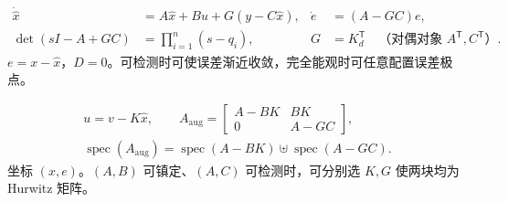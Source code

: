 {\[
\begin{aligned}
    \dot{\hat x}&=A\hat x+Bu+G(y-C\hat x),&
    \dot e&=(A-GC)e,\\
    \det(sI-A+GC)&=\prod\nolimits_{i=1}^{n}(s-q_i),&
    G&=K_d^{\mathsf T}\quad\text{（对偶对象 }A^{\mathsf T},C^{\mathsf T}\text{）}.
\end{aligned}
\]}
{$e=x-\hat x$，$D=0$。可检测时可使误差渐近收敛，完全能观时可任意配置误差极点。}

{\[
\begin{gathered}
    u=v-K\hat x,\qquad
    A_{\mathrm{aug}}=\begin{bmatrix}A-BK&BK\\0&A-GC\end{bmatrix},\\
    \operatorname{spec}(A_{\mathrm{aug}})
      =\operatorname{spec}(A-BK)\uplus\operatorname{spec}(A-GC).
\end{gathered}
\]}
{坐标 $(x,e)$。$(A,B)$ 可镇定、$(A,C)$ 可检测时，可分别选 $K,G$ 使两块均为 Hurwitz 矩阵。}
